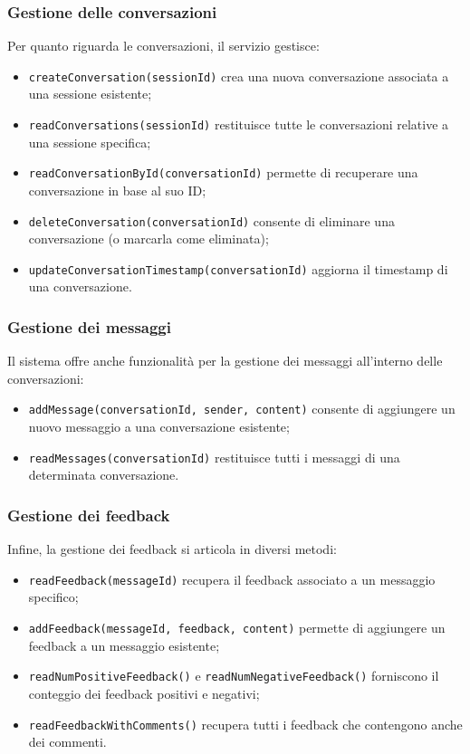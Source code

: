 \subsubsection*{Gestione delle conversazioni}
Per quanto riguarda le conversazioni, il servizio gestisce:
\begin{itemize}
    \item \texttt{createConversation(sessionId)} crea una nuova conversazione associata a una sessione esistente;
    \item \texttt{readConversations(sessionId)} restituisce tutte le conversazioni relative a una sessione specifica;
    \item \texttt{readConversationById(conversationId)} permette di recuperare una conversazione in base al suo ID;
    \item \texttt{deleteConversation(conversationId)} consente di eliminare una conversazione (o marcarla come eliminata);
    \item \texttt{updateConversationTimestamp(conversationId)} aggiorna il timestamp di una conversazione.
\end{itemize}

\subsubsection*{Gestione dei messaggi}
Il sistema offre anche funzionalità per la gestione dei messaggi all’interno delle conversazioni:
\begin{itemize}
    \item \texttt{addMessage(conversationId, sender, content)} consente di aggiungere un nuovo messaggio a una conversazione esistente;
    \item \texttt{readMessages(conversationId)} restituisce tutti i messaggi di una determinata conversazione.
\end{itemize}

\subsubsection*{Gestione dei feedback}
Infine, la gestione dei feedback si articola in diversi metodi:
\begin{itemize}
    \item \texttt{readFeedback(messageId)} recupera il feedback associato a un messaggio specifico;
    \item \texttt{addFeedback(messageId, feedback, content)} permette di aggiungere un feedback a un messaggio esistente;
    \item \texttt{readNumPositiveFeedback()} e \texttt{readNumNegativeFeedback()} forniscono il conteggio dei feedback positivi e negativi;
    \item \texttt{readFeedbackWithComments()} recupera tutti i feedback che contengono anche dei commenti.
\end{itemize}

